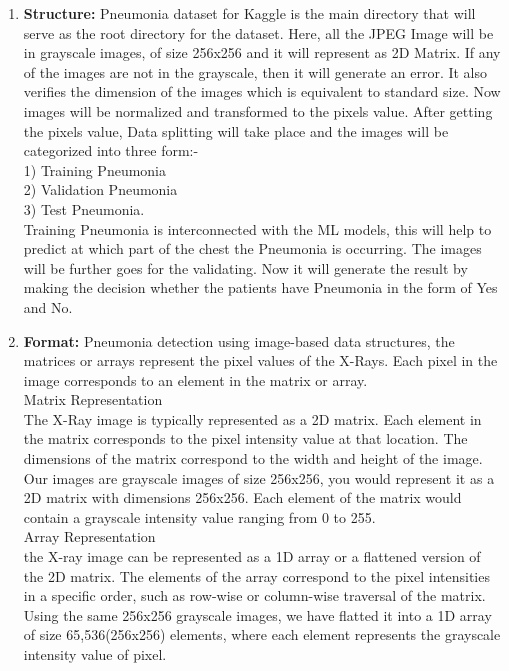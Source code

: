 \begin{enumerate}
	\item \textbf{Structure:} Pneumonia dataset for Kaggle is the main directory that will serve as the root directory for the dataset. Here, all the JPEG Image will be in grayscale images, of size 256x256 and it will represent as 2D Matrix. If any of the images are not in the grayscale, then it will generate an error. It also verifies the dimension of the images which is equivalent to standard size. Now images will be normalized and transformed to the pixels value. After getting the pixels value, Data splitting will take place and the images will be categorized into three form:-\\ 1) Training Pneumonia\\ 2) Validation Pneumonia\\ 3) Test Pneumonia. \\
	Training Pneumonia is interconnected with the ML models, this will help to predict at which part of the chest the Pneumonia is occurring. The images will be further goes for the validating. Now it will generate the result by making the decision whether the patients have Pneumonia in the form of Yes and No.
	
	\item \textbf{Format:}
	Pneumonia detection using image-based data structures, the matrices or arrays represent the pixel values of the X-Rays. Each pixel in the image corresponds to an element in the matrix or array.\\
	Matrix Representation\\
	The X-Ray image is typically represented as a 2D matrix. Each element in the matrix corresponds to the pixel intensity value at that location. The dimensions of the matrix correspond to the width and height of the image. Our images are grayscale images of size 256x256, you would represent it as a 2D matrix with dimensions 256x256. Each element of the matrix would contain a grayscale intensity value ranging from 0 to 255.\\
	Array Representation\\
	the X-ray image can be represented as a 1D array or a flattened version of the 2D matrix. The elements of the array correspond to the pixel intensities in a specific order, such as row-wise or column-wise traversal of the matrix. Using the same 256x256 grayscale images, we have flatted it into a 1D array of size 65,536(256x256) elements, where each element represents the grayscale intensity value of pixel.\\
	

\end{enumerate}
